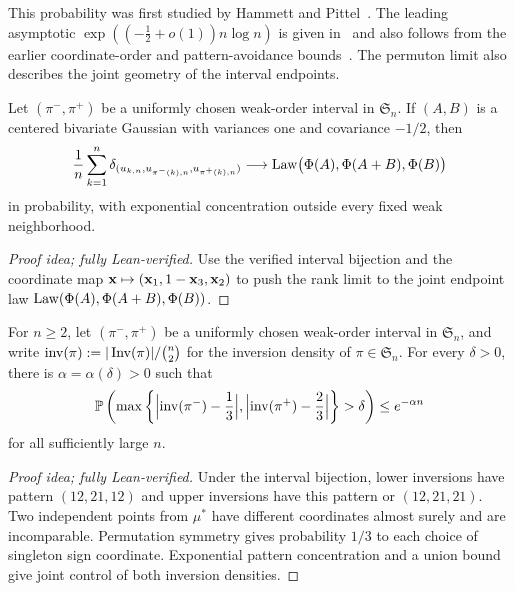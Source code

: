 \documentclass[11pt,letterpaper]{article}
\begin{document}
This probability was first studied by Hammett and Pittel~\cite{HP}. The leading asymptotic $\exp((-\frac12+o(1))n\log n)$ is given in~\cite[Theorem~1.1]{BCHHLM} and also follows from the earlier coordinate-order and pattern-avoidance bounds~\cite{CK,GP}.
The permuton limit also describes the joint geometry of the interval endpoints.


\begin{proposition}\label{prop:intervals}
      Let $(\pi^-,\pi^+)$ be a uniformly chosen weak-order interval in $\mathfrak S_n$. If $(A,B)$ is a centered bivariate Gaussian with variances one and covariance $-1/2$, then
      \begin{equation}\label{eq:interval-law}
            \frac1n\sum_{k=1}^n \delta_{(u_{k,n},u_{\pi^-(k),n},u_{\pi^+(k),n})} \longrightarrow \operatorname{Law}\bigl(\Phi(A),\Phi(A+B),\Phi(B)\bigr)
      \end{equation}
      in probability, with exponential concentration outside every fixed weak neighborhood.
\end{proposition}

\begin{proof}[Proof idea; fully Lean-verified]
Use the verified interval bijection and the coordinate map \(\mathbf x\mapsto(\mathbf x_1,1-\mathbf x_3,\mathbf x_2)\) to push the rank limit to the joint endpoint law \(\operatorname{Law}(\Phi(A),\Phi(A+B),\Phi(B))\).
\end{proof}



\begin{corollary}\label{cor:interval-inversions}
      For $n\ge2$, let $(\pi^-,\pi^+)$ be a uniformly chosen weak-order interval in $\mathfrak S_n$, and write $\operatorname{inv}(\pi):=|\operatorname{Inv}(\pi)|/\binom n2$ for the inversion density of $\pi\in\mathfrak S_n$. For every $\delta>0$, there is $\alpha=\alpha(\delta)>0$ such that
      \[
            \mathbb P\left(\max\left\{
            \Bigl|\operatorname{inv}(\pi^-)-\frac13\Bigr|,
            \Bigl|\operatorname{inv}(\pi^+)-\frac23\Bigr|\right\}
            >\delta\right)\le e^{-\alpha n}
      \]
      for all sufficiently large $n$.
\end{corollary}

\begin{proof}[Proof idea; fully Lean-verified]
Under the interval bijection, lower inversions have pattern $(12,21,12)$ and upper inversions have this pattern or $(12,21,21)$. Two independent points from $\mu^\ast$ have different coordinates almost surely and are incomparable. Permutation symmetry gives probability $1/3$ to each choice of singleton sign coordinate. Exponential pattern concentration and a union bound give joint control of both inversion densities.
\end{proof}
\end{document}

